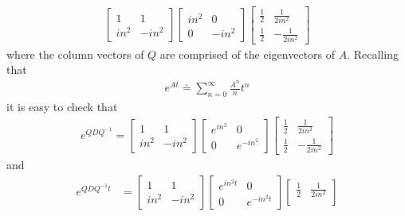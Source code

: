 \documentclass[12pt,reqno]{amsart}
\numberwithin{equation}{section}  %
\begin{document}
\begin{appendices}
\begin{equation*}
\begin{split}
\begin{bmatrix}
  1 & 1
  \\
  in^{2} & -in^{2}
  \end{bmatrix}
  \begin{bmatrix}
    in^{2} & 0 
    \\
    0 & -in^{2}
  \end{bmatrix}
  \begin{bmatrix}
    \frac{1}{2} & \frac{1}{2i n^{2}} \\
    \frac{1}{2} & -\frac{1}{2i n^{2} }
  \end{bmatrix}
\end{split}
\end{equation*}
%
%
where the column vectors of $Q$ are comprised of the eigenvectors of $A$.
Recalling that 
%
%
\begin{equation*}
\begin{split}
  e^{At} \doteq \sum_{n=0}^{\infty} \frac{A^{n}}{n}t^{n}
\end{split}
\end{equation*}
%
%
it is easy to check that 
%
%
\begin{equation*}
\begin{split}
  e^{Q D Q^{-1}} = 
\begin{bmatrix}
  1 & 1
  \\
  in^{2} & -in^{2}
  \end{bmatrix}
  \begin{bmatrix}
    e^{in^{2}} & 0 
    \\
    0 & e^{-in^{2}}
  \end{bmatrix}
  \begin{bmatrix}
    \frac{1}{2} & \frac{1}{2i n^{2}} \\
    \frac{1}{2} & -\frac{1}{2i n^{2} }
  \end{bmatrix}
\end{split}
\end{equation*}
%
%
and 
\begin{equation}
  \label{matrix-expo}
\begin{split}
  e^{Q D Q^{-1}t}
  & = 
\begin{bmatrix}
  1 & 1
  \\
  in^{2} & -in^{2}
  \end{bmatrix}
  \begin{bmatrix}
    e^{in^{2}t} & 0 
    \\
    0 & e^{-in^{2}t}
  \end{bmatrix}
\begin{bmatrix}
    \frac{1}{2} & \frac{1}{2i n^{2}} \\

\end{bmatrix}
\end{split}
\end{equation}
\end{appendices}
\end{document}
